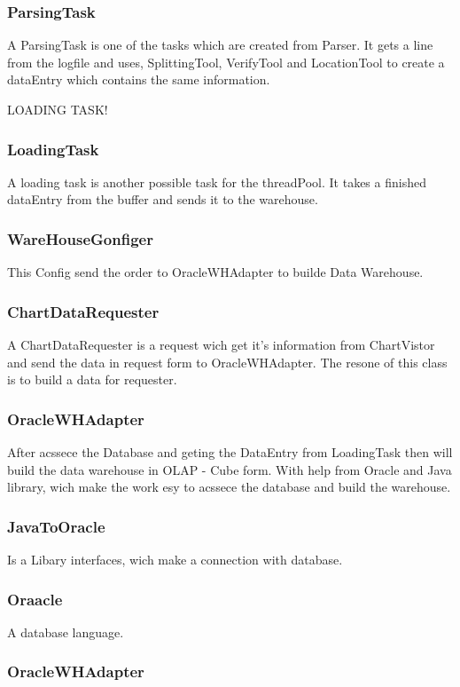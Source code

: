 \subsubsection*{ParsingTask}
A ParsingTask is one of the tasks which are created from Parser. It gets a line from the logfile and uses, SplittingTool, VerifyTool
and LocationTool to create a dataEntry which contains the same information. 

LOADING TASK!

\subsubsection*{LoadingTask}
A loading task is another possible task for the threadPool. It takes a finished dataEntry from the buffer and sends it to the warehouse.

\subsubsection*{WareHouseGonfiger}

This Config send the order to OracleWHAdapter to builde Data Warehouse.

\subsubsection*{ChartDataRequester}

A ChartDataRequester is a request wich get it's information from ChartVistor and send the data in request form to OracleWHAdapter.
The resone of this class is to build a data for requester.

\subsubsection*{OracleWHAdapter}

After acssece the Database and geting the DataEntry from LoadingTask then will build the data warehouse in OLAP - Cube form. With help from Oracle 
and Java library, wich make the work esy to acssece the database and build the warehouse.

\subsubsection*{JavaToOracle}

Is a Libary interfaces, wich make a connection with database.

\subsubsection*{Oraacle}

A database language.


\subsubsection*{OracleWHAdapter}
